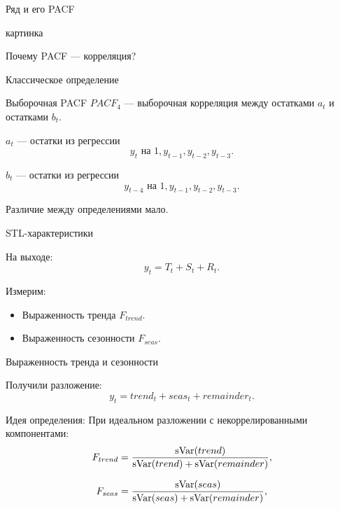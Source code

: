   \begin{frame}{Ряд и его PACF}

    картинка
    
  \end{frame}
    
  \begin{frame}{Почему PACF — корреляция?}

    \alert{Классическое определение}
  
    \begin{block}{Выборочная PACF}
      $PACF_4$ — выборочная корреляция между остатками $a_t$ и остатками $b_t$.

      $a_t$ — остатки из регрессии
      \[
        y_t \text{ на } 1, y_{t-1}, y_{t-2}, y_{t-3}.
      \]

      $b_t$ — остатки из регрессии
      \[
        y_{t-4} \text{ на } 1, y_{t-1}, y_{t-2}, y_{t-3}.
      \]
    \end{block}
  
  \pause
  Различие между определениями \alert{мало}. 
  
  \end{frame}
  

  \begin{frame}{STL-характеристики}

    \alert{На выходе:}
    \[
      y_t = T_t + S_t + R_t.
    \]

    \pause
    Измерим:
    \begin{itemize}
      \item Выраженность тренда $F_{trend}$.
      \item Выраженность сезонности $F_{seas}$.
    \end{itemize}

  \end{frame}

  \begin{frame}{Выраженность тренда и сезонности}

    Получили разложение:
    \[
      y_t = trend_t + seas_t + remainder_t.
    \]
    
    \pause
    \alert{Идея определения:}
    При идеальном разложении с некоррелированными компонентами:
    \[
      F_{trend} = \frac{\operatorname{sVar}(trend)}{\operatorname{sVar}(trend) + \operatorname{sVar}(remainder)},
    \]

    \pause
    \[
    F_{seas} = \frac{\operatorname{sVar}(seas)}{\operatorname{sVar}(seas) + \operatorname{sVar}(remainder)},
  \]
  \end{frame}

